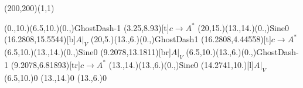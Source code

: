 \unitlength=1bp%

\begin{feynartspicture}(200,200)(1,1)

\FADiagram{}
\FAProp(0.,10.)(6.5,10.)(0.,){GhostDash}{-1}
\FALabel(3.25,8.93)[t]{$c\to A^*$}
\FAProp(20,15.)(13.,14.)(0.,){Sine}{0}
\FALabel(16.2808,15.5544)[b]{$A|_V$}
\FAProp(20,5.)(13.,6.)(0.,){GhostDash}{1}
\FALabel(16.2808,4.44558)[t]{$c\to A^*$}
\FAProp(6.5,10.)(13.,14.)(0.,){Sine}{0}
\FALabel(9.2078,13.1811)[br]{$A|_V$}
\FAProp(6.5,10.)(13.,6.)(0.,){GhostDash}{-1}
\FALabel(9.2078,6.81893)[tr]{$c\to A^*$}
\FAProp(13.,14.)(13.,6.)(0.,){Sine}{0}
\FALabel(14.2741,10.)[l]{$A|_V$}
\FAVert(6.5,10.){0}
\FAVert(13.,14.){0}
\FAVert(13.,6.){0}
\end{feynartspicture}

